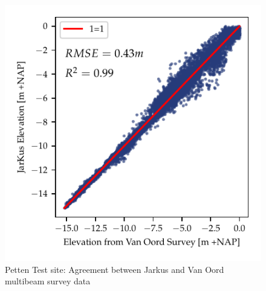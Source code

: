 
\begin{figure}[ht]
    \centering
    \includegraphics{figures/petten_lidar_estimated_vs_truth.pdf}
    \caption{Petten Test site: Agreement between Jarkus and Van Oord multibeam survey data}    \label{fig:petten-bias-plot}
\end{figure}

